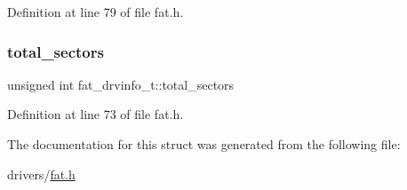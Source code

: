Definition at line 79 of file fat.\+h.

\mbox{\label{a00065_a47d5e31a3e5c6c314f49705a3961f7ea_a47d5e31a3e5c6c314f49705a3961f7ea}} 
\subsubsection{\texorpdfstring{total\+\_\+sectors}{total\_sectors}}
{\footnotesize\ttfamily unsigned int fat\+\_\+drvinfo\+\_\+t\+::total\+\_\+sectors}



Definition at line 73 of file fat.\+h.



The documentation for this struct was generated from the following file\+:\begin{DoxyCompactItemize}
\item 
drivers/\hyperlink{a00002}{fat.\+h}\end{DoxyCompactItemize}
